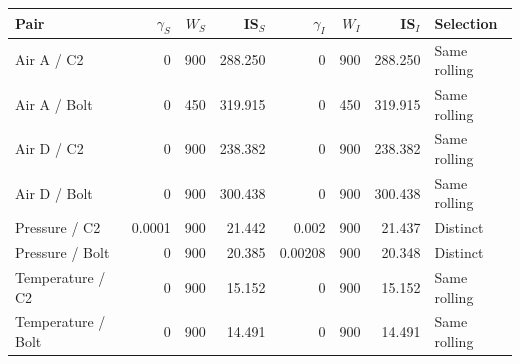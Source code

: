 \begin{tabular}{lrrrrrrl}
\toprule
Pair & $\gamma_S$ & $W_S$ & IS$_S$ & $\gamma_I$ & $W_I$ & IS$_I$ & Selection \\
\midrule
Air A / C2 & 0 & 900 & 288.250 & 0 & 900 & 288.250 & Same rolling \\
Air A / Bolt & 0 & 450 & 319.915 & 0 & 450 & 319.915 & Same rolling \\
Air D / C2 & 0 & 900 & 238.382 & 0 & 900 & 238.382 & Same rolling \\
Air D / Bolt & 0 & 900 & 300.438 & 0 & 900 & 300.438 & Same rolling \\
Pressure / C2 & 0.0001 & 900 & 21.442 & 0.002 & 900 & 21.437 & Distinct \\
Pressure / Bolt & 0 & 900 & 20.385 & 0.00208 & 900 & 20.348 & Distinct \\
Temperature / C2 & 0 & 900 & 15.152 & 0 & 900 & 15.152 & Same rolling \\
Temperature / Bolt & 0 & 900 & 14.491 & 0 & 900 & 14.491 & Same rolling \\
\bottomrule
\end{tabular}
